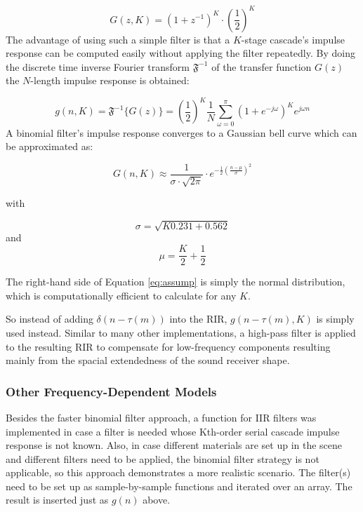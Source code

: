 \documentclass[twoside,a4paper]{article}
\begin{document}
\begin{equation}
G(z,K) = (1+z^{-1})^K \cdot \left(\frac{1}{2}\right)^K
\end{equation}
The advantage of using such a simple filter is that a $K$-stage cascade's impulse response can be computed easily without applying the filter repeatedly. By doing the discrete time inverse Fourier transform $\mathfrak{F}^{-1}$ of the transfer function $G(z)$ the $N$-length impulse response is obtained:

\begin{equation}
  g(n,K) = \mathfrak{F}^{-1}\{ G(z) \} = \left(\frac{1}{2}\right)^K \frac{1}{N}  \sum_{\omega = 0}^\pi (1+e^{-j\omega})^{K} e^{j\omega n} 
\end{equation}
A binomial filter's impulse response converges to a Gaussian bell curve which can be approximated as:

\begin{equation}
G(n,K) \approx  \frac{1}{\sigma \cdot \sqrt{2 \pi}} \cdot e ^{-\frac{1}{2} (\frac{n-\mu}{\sigma})^2}
\label{eq:assump}
\end{equation}


with 

\begin{equation}
\sigma = \sqrt{K 0.231 + 0.562}
\end{equation}
and 
\begin{equation}
\mu = \frac{K}{2} + \frac{1}{2}
\end{equation}

The right-hand side of Equation \ref{eq:assump} is simply the normal distribution, which is computationally efficient to calculate for any $K$.

So instead of adding $\delta(n-\tau(m))$ into the RIR, $g(n-\tau(m),K)$ is simply used instead. 
Similar to many other implementations, a high-pass filter is applied to the resulting RIR to compensate for low-frequency components resulting mainly from the spacial extendedness of the sound receiver shape.

\subsubsection*{Other Frequency-Dependent Models}
Besides the faster binomial filter approach, a function for IIR filters was implemented in case a filter is needed whose Kth-order serial cascade impulse response is not known. Also, in case different materials are set up in the scene and different filters need to be applied, the binomial filter strategy is not applicable, so this approach demonstrates a more realistic scenario. The filter(s) need to be set up as sample-by-sample functions and iterated over an array. The result is inserted just as $g(n)$ above.
\end{document}
